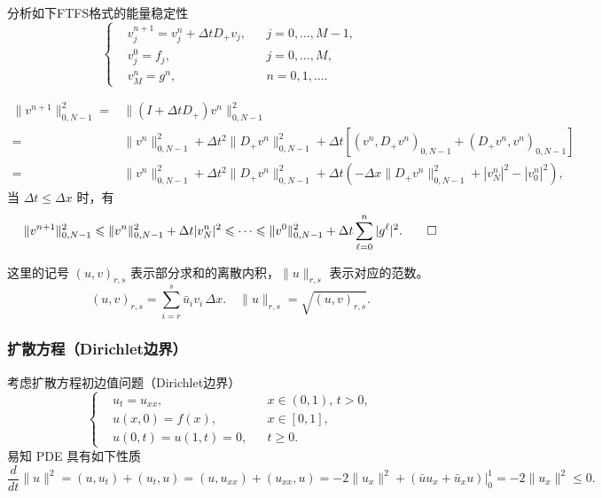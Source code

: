 \begin{example}
    分析如下FTFS格式的能量稳定性
    \[
        \left\{
        \begin{aligned}
             & v_j^{n+1} = v_j^n + \Delta t D_+ v_j, &  & j=0,\dots,M-1, \\
             & v_j^0 = f_j,                          &  & j=0,\dots,M,   \\
             & v_M^n = g^n,                          &  & n=0,1,\dots.
        \end{aligned}
        \right.
    \]
\end{example}

\begin{solution*}
    \begin{align*}
        \| v^{n+1}\|_{0,N-1}^2
        ={} & \|(I + \Delta t D_+) v^n\|_{0,N-1}^2                    \\
        ={} & \| v^n \|_{0,N-1}^2 + \Delta t^2 \| D_+ v^n\|_{0,N-1}^2
        + \Delta t \left[
            \left( v^n, D_+ v^n \right)_{0,N-1} + \left( D_+ v^n, v^n \right)_{0,N-1}
            \right]
        \\
        ={} & \| v^n \|_{0,N-1}^2 + \Delta t^2 \| D_+ v^n\|_{0,N-1}^2
        + \Delta t \left(
        - \Delta x \| D_+ v^n\|_{0,N-1}^2 + |v^n_N|^2 - |v^n_0|^2
        \right),
    \end{align*}
    当 $\Delta t \le \Delta x$ 时，有
    \[
        \| v^{n+1}\|_{0,N-1}^2 \le \| v^n \|_{0,N-1}^2  + \Delta t |v^n_N|^2
        \le \cdots \le \| v^0 \|_{0,N-1}^2  + \Delta t \sum_{\ell=0}^{n} |g^\ell|^2. \qedhere
    \]
\end{solution*}

\begin{remark}
    这里的记号 $(u,v)_{r,s}$ 表示部分求和的离散内积，$\|u\|_{r,s}$ 表示对应的范数。
    \[
        (u,v)_{r,s} = \sum_{i=r}^{s} \bar{u}_i v_i\, \Delta x.
        \quad \|u\|_{r,s} = \sqrt{(u,v)_{r,s}}.
    \]
\end{remark}

\subsubsection{扩散方程（Dirichlet边界）}

考虑扩散方程初边值问题（Dirichlet边界）
\[
    \left\{
    \begin{aligned}
         & u_t = u_{xx},        &  & x \in (0,1),\, t > 0, \\
         & u(x,0) = f(x),       &  & x \in [0,1],          \\
         & u(0,t) = u(1,t) = 0, &  & t \ge 0.
    \end{aligned}
    \right.
\]
易知 PDE 具有如下性质
\[
    \frac{d}{dt}\|u\|^2 = (u,u_t) + (u_t,u) = (u,u_{xx}) + (u_{xx},u)
    = -2 \|u_x\|^2 + (\bar{u} u_x + \bar{u}_x u) \big|_0^1 = -2 \|u_x\|^2 \le 0.
\]

